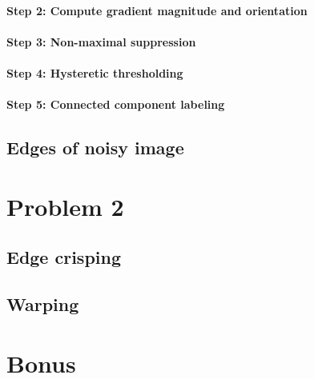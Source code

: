 \documentclass[12pt]{article}
\begin{document}
\paragraph*{Step 2: Compute gradient magnitude and orientation}

\paragraph*{Step 3: Non-maximal suppression}

\paragraph*{Step 4: Hysteretic thresholding}

\paragraph*{Step 5: Connected component labeling}

\subsection*{Edges of noisy image}

\section*{Problem 2}
\subsection*{Edge crisping}

\subsection*{Warping}

\section*{Bonus}
\end{document}
